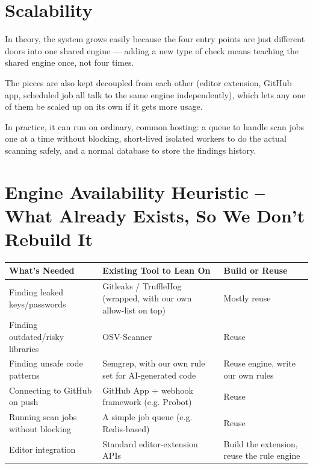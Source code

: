 \documentclass[12pt,a4paper]{article}
\begin{document}
\section{Scalability}

In theory, the system grows easily because the four entry points are just different doors into one shared engine --- adding a new type of check means teaching the shared engine once, not four times.

The pieces are also kept decoupled from each other (editor extension, GitHub app, scheduled job all talk to the same engine independently), which lets any one of them be scaled up on its own if it gets more usage.

In practice, it can run on ordinary, common hosting: a queue to handle scan jobs one at a time without blocking, short-lived isolated workers to do the actual scanning safely, and a normal database to store the findings history.

\section{Engine Availability Heuristic -- What Already Exists, So We Don't Rebuild It}

\begin{longtable}{p{}p{}p{}}
\toprule
\textbf{What's Needed} & \textbf{Existing Tool to Lean On} & \textbf{Build or Reuse} \\
\midrule
Finding leaked keys/passwords &
Gitleaks / TruffleHog (wrapped, with our own allow-list on top) &
Mostly reuse \\

Finding outdated/risky libraries &
OSV-Scanner &
Reuse \\

Finding unsafe code patterns &
Semgrep, with our own rule set for AI-generated code &
Reuse engine, write our own rules \\

Connecting to GitHub on push &
GitHub App + webhook framework (e.g. Probot) &
Reuse \\

Running scan jobs without blocking &
A simple job queue (e.g. Redis-based) &
Reuse \\

Editor integration &
Standard editor-extension APIs &
Build the extension, reuse the rule engine \\
\bottomrule
\end{longtable}
\end{document}
